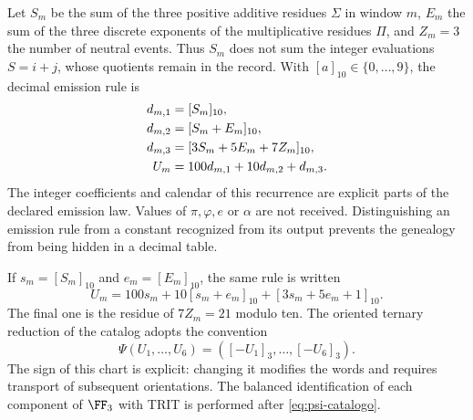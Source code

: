 Let \(S_m\) be the sum of the three positive additive residues \(\Sigma\) in window \(m\), \(E_m\) the sum of the three discrete exponents of the multiplicative residues \(\Pi\), and \(Z_m=3\) the number of neutral events. Thus \(S_m\) does not sum the integer evaluations \(S=i+j\), whose quotients remain in the record. With \([a]_{10}\in\{0,\ldots,9\}\), the decimal emission rule is
\begin{align}
 d_{m,1}&=[S_m]_{10},\notag\\
 d_{m,2}&=[S_m+E_m]_{10},\notag\\
 d_{m,3}&=[3S_m+5E_m+7Z_m]_{10},\notag\\
 U_m&=100d_{m,1}+10d_{m,2}+d_{m,3}.
 \label{eq:emisor-seis}
\end{align}
The integer coefficients and calendar of this recurrence are explicit parts of the declared emission law. Values of \(\pi,\varphi,e\) or \(\alpha\) are not received. Distinguishing an emission rule from a constant recognized from its output prevents the genealogy from being hidden in a decimal table.

If \(s_m=[S_m]_{10}\) and \(e_m=[E_m]_{10}\), the same rule is written
\begin{equation}
 U_m=100s_m+10[s_m+e_m]_{10}+[3s_m+5e_m+1]_{10}.
 \label{eq:acoplamiento}
\end{equation}
The final one is the residue of \(7Z_m=21\) modulo ten. The oriented ternary reduction of the catalog adopts the convention
\begin{equation}
 \Psi(U_1,\ldots,U_6)=([-U_1]_3,\ldots,[-U_6]_3).
 \label{eq:psi-catalogo}
\end{equation}
The sign of this chart is explicit: changing it modifies the words and requires transport of subsequent orientations. The balanced identification of each component of \(\FF_3\) with TRIT is performed after \eqref{eq:psi-catalogo}.

